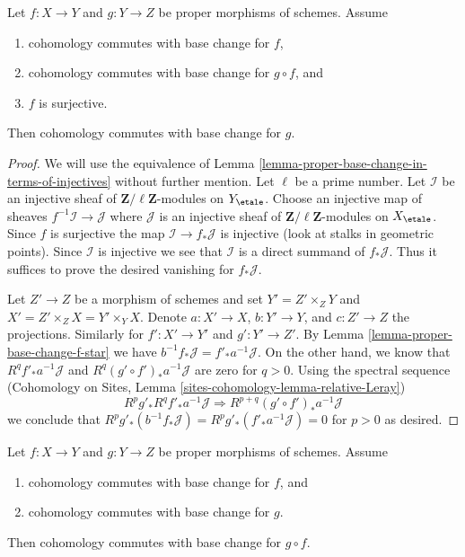\begin{lemma}
\label{lemma-sandwich}
Let $f : X \to Y$ and $g : Y \to Z$ be proper morphisms of schemes. Assume
\begin{enumerate}
\item cohomology commutes with base change for $f$,
\item cohomology commutes with base change for $g \circ f$, and
\item $f$ is surjective.
\end{enumerate}
Then cohomology commutes with base change for $g$.
\end{lemma}

\begin{proof}
We will use the equivalence of
Lemma \ref{lemma-proper-base-change-in-terms-of-injectives}
without further mention. Let $\ell$ be a prime number.
Let $\mathcal{I}$ be an injective sheaf of
$\mathbf{Z}/\ell\mathbf{Z}$-modules on $Y_\etale$.
Choose an injective map of sheaves $f^{-1}\mathcal{I} \to \mathcal{J}$
where $\mathcal{J}$ is an injective sheaf of
$\mathbf{Z}/\ell\mathbf{Z}$-modules on $X_\etale$.
Since $f$ is surjective the map $\mathcal{I} \to f_*\mathcal{J}$
is injective (look at stalks in geometric points).
Since $\mathcal{I}$ is injective we see that $\mathcal{I}$
is a direct summand of $f_*\mathcal{J}$. Thus it suffices
to prove the desired vanishing for $f_*\mathcal{J}$.

\medskip\noindent
Let $Z' \to Z$ be a morphism of schemes and set
$Y' = Z' \times_Z Y$ and $X' = Z' \times_Z X = Y' \times_ Y X$.
Denote $a : X' \to X$, $b : Y' \to Y$, and $c : Z' \to Z$ the
projections. Similarly for $f' : X' \to Y'$ and $g' : Y' \to Z'$.
By Lemma \ref{lemma-proper-base-change-f-star} we have
$b^{-1}f_*\mathcal{J} = f'_*a^{-1}\mathcal{J}$.
On the other hand, we know that $R^qf'_*a^{-1}\mathcal{J}$ and
$R^q(g' \circ f')_*a^{-1}\mathcal{J}$ are zero for $q > 0$.
Using the spectral sequence
(Cohomology on Sites, Lemma \ref{sites-cohomology-lemma-relative-Leray})
$$
R^pg'_* R^qf'_* a^{-1}\mathcal{J} \Rightarrow
R^{p + q}(g' \circ f')_* a^{-1}\mathcal{J}
$$
we conclude that
$ R^pg'_*(b^{-1}f_*\mathcal{J}) = R^pg'_*(f'_*a^{-1}\mathcal{J}) = 0$
for $p > 0$ as desired.
\end{proof}

\begin{lemma}
\label{lemma-composition}
Let $f : X \to Y$ and $g : Y \to Z$ be proper morphisms of schemes. Assume
\begin{enumerate}
\item cohomology commutes with base change for $f$, and
\item cohomology commutes with base change for $g$.
\end{enumerate}
Then cohomology commutes with base change for $g \circ f$.
\end{lemma}

